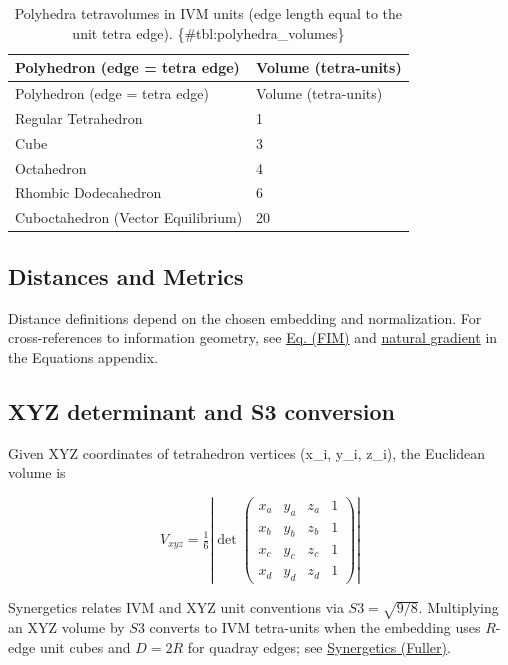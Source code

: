 \documentclass[
  10pt,
]{article}
\begin{document}
\begin{longtable}[]{@{}ll@{}}
\caption{Polyhedra tetravolumes in IVM units (edge length equal to the
unit tetra edge). \{\#tbl:polyhedra\_volumes\}}\tabularnewline
\toprule
Polyhedron (edge = tetra edge) & Volume (tetra-units)\tabularnewline
\midrule
\endfirsthead
\toprule
Polyhedron (edge = tetra edge) & Volume (tetra-units)\tabularnewline
\midrule
\endhead
Regular Tetrahedron & 1\tabularnewline
Cube & 3\tabularnewline
Octahedron & 4\tabularnewline
Rhombic Dodecahedron & 6\tabularnewline
Cuboctahedron (Vector Equilibrium) & 20\tabularnewline
\bottomrule
\end{longtable}

\hypertarget{distances-and-metrics}{%
\subsection{Distances and Metrics}\label{distances-and-metrics}}

Distance definitions depend on the chosen embedding and normalization.
For cross-references to information geometry, see
\href{08_equations_appendix.md\#eq:fim}{Eq. (FIM)} and
\href{08_equations_appendix.md\#eq:natgrad}{natural gradient} in the
Equations appendix.

\hypertarget{sec:xyz_conversion}{%
\subsection{XYZ determinant and S3
conversion}\label{sec:xyz_conversion}}

Given XYZ coordinates of tetrahedron vertices (x\_i, y\_i, z\_i), the
Euclidean volume is

\begin{equation}\label{eq:xyz_det}
V_{xyz} = \tfrac{1}{6} \left| \det \begin{pmatrix}
 x_a & y_a & z_a & 1 \\
 x_b & y_b & z_b & 1 \\
 x_c & y_c & z_c & 1 \\
 x_d & y_d & z_d & 1
\end{pmatrix} \right|
\end{equation}

Synergetics relates IVM and XYZ unit conventions via
\(S3 = \sqrt{9/8}\). Multiplying an XYZ volume by \(S3\) converts to IVM
tetra-units when the embedding uses \(R\)-edge unit cubes and \(D=2R\)
for quadray edges; see
\href{https://en.wikipedia.org/wiki/Synergetics_(Fuller)}{Synergetics
(Fuller)}.
\end{document}
